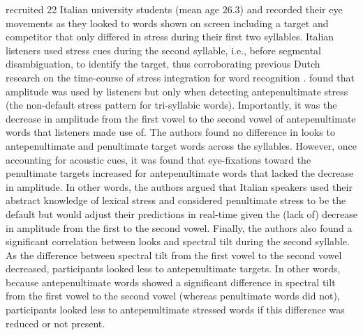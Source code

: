 \cite{Sulpizio_McQueen_2012} recruited 22 Italian university students (mean age 26.3) and recorded their eye movements as they looked to words shown on screen including a target and competitor that only differed in stress during their first two syllables.  Italian listeners used stress cues during the second syllable, i.e., before segmental disambiguation, to identify the target, thus corroborating previous Dutch research on the time-course of stress integration for word recognition \citep{Reinisch2010}. \cite{Sulpizio_McQueen_2012} found that amplitude was used by listeners but only when detecting antepenultimate stress (the non-default stress pattern for tri-syllabic words). Importantly, it was the decrease in amplitude from the first vowel to the second vowel of antepenultimate words that listeners made use of. The authors found no difference in looks to antepenultimate and penultimate target words across the syllables. However, once accounting for acoustic cues, it was found that eye-fixations toward the penultimate targets increased for antepenultimate words that lacked the decrease in amplitude. In other words, the authors argued that Italian speakers used their abstract knowledge of lexical stress and considered penultimate stress to be the default but would adjust their predictions in real-time given the (lack of) decrease in amplitude from the first to the second vowel. Finally, the authors also found a significant correlation between looks and spectral tilt during the second syllable. As the difference between spectral tilt from the first vowel to the second vowel decreased, participants looked less to antepenultimate targets. In other words, because antepenultimate words showed a significant difference in spectral tilt from the first vowel to the second vowel (whereas penultimate words did not), participants looked less to antepenultimate stressed words if this difference was reduced or not present. 



